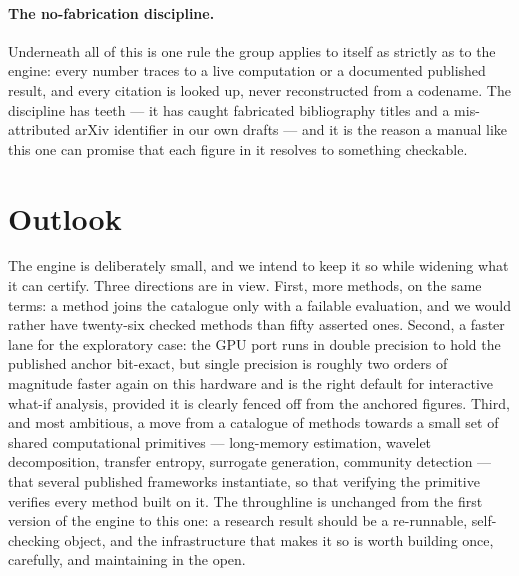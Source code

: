 \documentclass[11pt]{article}
\begin{document}
\paragraph{The no-fabrication discipline.} Underneath all of this is one rule the
group applies to itself as strictly as to the engine: every number traces to a
live computation or a documented published result, and every citation is looked
up, never reconstructed from a codename. The discipline has teeth --- it has
caught fabricated bibliography titles and a mis-attributed arXiv identifier in
our own drafts --- and it is the reason a manual like this one can promise that
each figure in it resolves to something checkable.

\section{Outlook}
The engine is deliberately small, and we intend to keep it so while widening
what it can certify. Three directions are in view. First, more methods, on the
same terms: a method joins the catalogue only with a failable evaluation, and we
would rather have twenty-six checked methods than fifty asserted ones. Second, a
faster lane for the exploratory case: the GPU port runs in double precision to
hold the published anchor bit-exact, but single precision is roughly two orders
of magnitude faster again on this hardware and is the right default for
interactive what-if analysis, provided it is clearly fenced off from the
anchored figures. Third, and most ambitious, a move from a catalogue of methods
towards a small set of shared computational primitives --- long-memory
estimation, wavelet decomposition, transfer entropy, surrogate generation,
community detection --- that several published frameworks instantiate, so that
verifying the primitive verifies every method built on it. The throughline is
unchanged from the first version of the engine to this one: a research result
should be a re-runnable, self-checking object, and the infrastructure that makes
it so is worth building once, carefully, and maintaining in the open.
\end{document}
